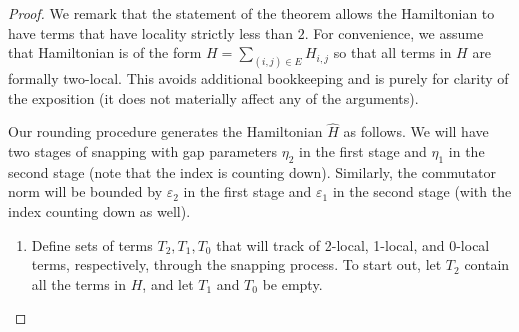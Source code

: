 \documentclass[11pt]{article}
\theoremstyle{plain}
\newcommand{\eps}{\varepsilon}
\begin{document}
\begin{proof}
We remark that the statement of the theorem allows the Hamiltonian to have terms that have locality strictly less than $2$. For convenience, we assume that Hamiltonian is of the form $H = \sum_{(i,j) \in E} H_{i,j}$ so that all terms in $H$ are formally two-local. This avoids additional bookkeeping and is purely for clarity of the exposition (it does not materially affect any of the arguments).

Our rounding procedure generates the Hamiltonian $\hat{H}$ as follows. We will have two stages of snapping with gap parameters $\eta_2$ in the first stage and $\eta_1$ in the second stage (note that the index is counting down). Similarly, the commutator norm will be bounded by $\eps_2$ in the first stage and $\eps_1$ in the second stage (with the index counting down as well).

\begin{enumerate}

    \item Define sets of terms $T_2, T_1, T_0$ that will track of 2-local, 1-local, and 0-local terms, respectively, through the snapping process. To start out, let $T_2$ contain all the terms in $H$, and let $T_1$ and $T_0$ be empty.
    

\end{enumerate}
\end{proof}
\end{document}
